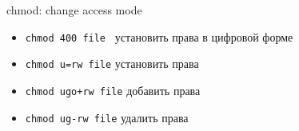 \begin{frame}[fragile]{chmod: change access mode}
    \begin{itemize}
      \item \verb;chmod 400 file ; установить права в цифровой форме
      \item \verb;chmod u=rw file;  установить права
      \item \verb;chmod ugo+rw file; добавить права
      \item \verb;chmod ug-rw file; удалить права
    \end{itemize}
\end{frame}
